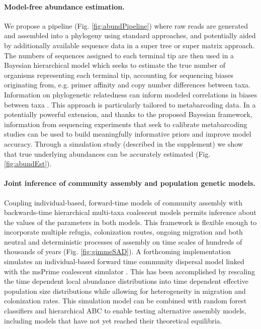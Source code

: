 \documentclass[12pt]{article}
\begin{document}
\paragraph{Model-free abundance estimation.} We propose a pipeline
(Fig. \ref{fig:abundPipeline}) where raw reads are generated and
assembled into a phylogeny using standard approaches, and potentially
aided by additionally available sequence data in a super tree or super
matrix approach. The numbers of sequences assigned to each terminal
tip are then used in a Bayesian hierarchical model which seeks to
estimate the true number of organisms representing each terminal tip,
accounting for sequencing biases originating from, e.g. primer
affinity and copy number differences between taxa.  Information on
phylogenetic relatedness can inform modeled correlations in biases
between taxa \citep[e.g. copy number is known to be phylogenetically
conserved at least in microbes]{angly2014}. This approach is
particularly tailored to metabarcoding data. In a potentially powerful
extension, and thanks to the proposed Bayesian framework, information
from sequencing experiments that seek to calibrate metabarcoding
studies \citep[e.g.,][]{krehenwinkel2016, Saitoh2016} can be used to
build meaningfully informative priors and improve model
accuracy. Through a simulation study (described in the supplement) we
show that true underlying abundances can be accurately estimated
(Fig. \ref{fig:abundEst}).

\paragraph{Joint inference of community assembly and population
  genetic models.} Coupling individual-based, forward-time models of
community assembly with backwards-time hierarchical multi-taxa
coalescent models permits inference about the values of the parameters
in both models. This framework is flexible enough to incorporate
multiple refugia, colonization routes, ongoing migration and both
neutral and deterministic processes of assembly on time scales of
hundreds of thousands of years (Fig. \ref{fig:gimmeSAD}). A
forthcoming implementation \citep[gimmeSAD$\pi$;][]{overcast}
simulates an individual-based forward time community dispersal model
\citep{Rosindell2015-dk} linked with the msPrime coalescent simulator
\citep{kelleher2016}. This has been accomplished by rescaling the time
dependent local abundance distributions into time dependent effective
population size distributions while allowing for heterogeneity in
migration and colonization rates. This simulation model can be
combined with random forest classifiers and hierarchical ABC to enable
testing alternative assembly models, including models that have not
yet reached their theoretical equilibria.
\end{document}
